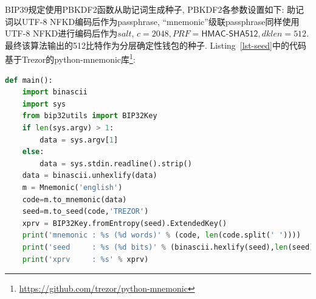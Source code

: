 
BIP39规定使用\textsf{PBKDF2}函数从助记词生成种子, \textsf{PBKDF2}各参数设置如下:
助记词以UTF-8 NFKD编码后作为passphrase,
“mnemonic”级联passphrase同样使用UTF-8 NFKD进行编码后作为$salt$,
$c=2048, PRF=\textsf{HMAC-SHA512}, dklen=512$.
最终该算法输出的512比特作为分层确定性钱包的种子.
Listing~\ref{lst-seed}中的代码基于Trezor的python-mnemonic库\footnote{\url{https://github.com/trezor/python-mnemonic}}:

\begin{lstlisting}[language=python, caption=想一个名字, label=lst-seed]
def main():
    import binascii
    import sys
    from bip32utils import BIP32Key
    if len(sys.argv) > 1:
        data = sys.argv[1]
    else:
        data = sys.stdin.readline().strip()
    data = binascii.unhexlify(data)
    m = Mnemonic('english')
    code=m.to_mnemonic(data)
    seed=m.to_seed(code,'TREZOR')
    xprv = BIP32Key.fromEntropy(seed).ExtendedKey()
    print('mnemonic : %s (%d words)' % (code, len(code.split(' '))))
    print('seed     : %s (%d bits)' % (binascii.hexlify(seed),len(seed) * 4))
    print('xprv     : %s' % xprv)
\end{lstlisting}

